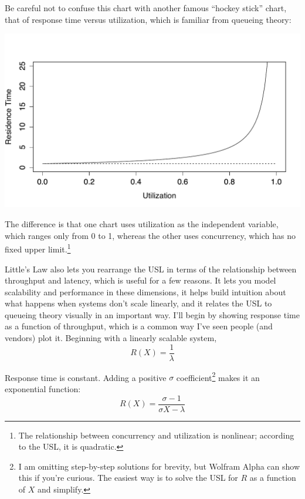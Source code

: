 \documentclass{vivid_layout}
\begin{document}
Be careful not to confuse this chart with another famous ``hockey stick'' chart,
that of response time versus utilization, which is familiar from queueing
theory:
\begin{center}
\includegraphics[width=.85\linewidth]{scalability/hockey}
\end{center}

The difference is that one chart uses utilization as the independent variable,
which ranges only from 0 to 1, whereas the other uses concurrency, which has no
fixed upper limit.\footnote{The relationship between concurrency and utilization
is nonlinear; according to the USL, it is quadratic.}

Little's Law also lets you rearrange the USL in terms of the relationship
between throughput and latency, which is useful for a few reasons. It lets you
model scalability and performance in these dimensions, it helps build intuition
about what happens when systems don't scale linearly,  and it relates the USL to
queueing theory visually in an important way.
I'll begin by showing response time as a function of throughput, which is a
common way I've seen people (and vendors) plot it. Beginning with a linearly
scalable system,
\[
R(X) = \frac{1}{\lambda}
\]

Response time is constant. Adding a positive $\sigma$ coefficient\footnote{I am
omitting step-by-step solutions for brevity, but Wolfram Alpha can show this if
you're curious. The easiest way is to solve the USL for $R$ as a function of
$X$ and simplify.} makes it an exponential function:
\begin{equation}
R(X) = \frac{\sigma - 1}{\sigma X - \lambda}
\label{amdahl_r_x}
\end{equation}
\end{document}
